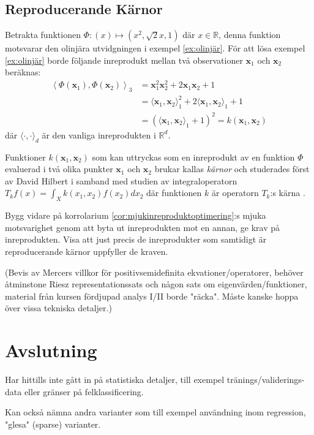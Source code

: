 \documentclass[a4paper, 12pt]{report}
\theoremstyle{definition}
\theoremstyle{remark}
\newcommand{\bfx}{\mathbf{x}}
\begin{document}
\section{Reproducerande Kärnor}
Betrakta funktionen $\Phi:(x)\longmapsto (x^2,\sqrt{2}x, 1)$ där $x\in\mathbb{R}$, denna funktion motsvarar den olinjära utvidgningen i exempel \ref{ex:olinjär}. För att lösa exempel \ref{ex:olinjär} borde följande inreprodukt mellan två observationer $\mathbf{x}_1$ och $\mathbf{x}_2$ beräknas:
\begin{align*}
	\left\langle \Phi(\mathbf{x}_1), \Phi(\mathbf{x}_2) \right\rangle_3 &= \bfx_1^2\bfx_2^2 + 2\bfx_1\bfx_2 + 1\\
	&= \langle \bfx_1, \bfx_2 \rangle_1^2 + 2\langle \bfx_1, \bfx_2 \rangle_1 + 1\\
	&= \left(\langle\bfx_1, \bfx_2 \rangle_1 + 1\right)^2 = k(\bfx_1, \bfx_2)
\end{align*}
där $\langle \cdot, \cdot \rangle_d$ är den vanliga inreprodukten i $\mathbb{R}^d$.

Funktioner $k(\bfx_1, \bfx_2)$ som kan uttryckas som en inreprodukt av en funktion $\Phi$ evaluerad i två olika punkter $\bfx_1$ och $\bfx_2$ brukar kallas \emph{kärnor} och studerades först av David Hilbert \cite{Hilbert} i samband med studien av integraloperatorn $T_k f(x)=\int_{X}k(x_1, x_2)f(x_2)dx_2$ där funktionen $k$ är operatorn $T_k$:s kärna \cite{LearningKernels}.



Bygg vidare på korrolarium \ref{cor:mjukinreproduktoptimering}:s mjuka motsvarighet genom att byta ut inreprodukten mot en annan, ge krav på inreprodukten. Visa att just precis de inreprodukter som samtidigt är reproducerande kärnor uppfyller de kraven.

(Bevis av Mercers villkor för positivsemidefinita ekvationer/operatorer, behöver åtminstone Riesz representationssats och någon sats om eigenvärden/funktioner, material från kursen fördjupad analys I/II borde "räcka". Måste kanske hoppa över vissa tekniska detaljer.)

\chapter{Avslutning}
Har hittills inte gått in på statistiska detaljer, till exempel tränings/validerings-data eller gränser på felklassificering.

Kan också nämna andra varianter som till exempel användning inom regression, "glesa" (sparse) varianter.



\end{document}
